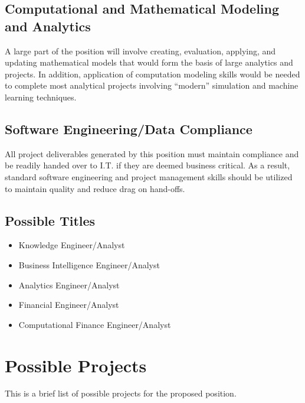 \documentclass[letterpaper]{article}
\begin{document}
    \subsection{Computational and Mathematical Modeling and Analytics}

    A large part of the position will involve creating, evaluation, applying,
    and updating mathematical models that would form the basis of large
    analytics and projects.  In addition, application of computation modeling
    skills would be needed to complete most analytical projects involving
    ``modern'' simulation and machine learning techniques.
    
    \subsection{Software Engineering/Data Compliance}

    All project deliverables generated by this position must maintain
    compliance and be readily handed over to I.T. if they are deemed business
    critical. As a result, standard software engineering and project management
    skills should be utilized to maintain quality and reduce drag on hand-offs.

    \subsection{Possible Titles}

    \begin{itemize}
        \item Knowledge Engineer/Analyst
        \item Business Intelligence Engineer/Analyst
        \item Analytics Engineer/Analyst
        \item Financial Engineer/Analyst
        \item Computational Finance Engineer/Analyst
    \end{itemize}


\section{Possible Projects}

    This is a brief list of possible projects for the proposed position.
\end{document}
